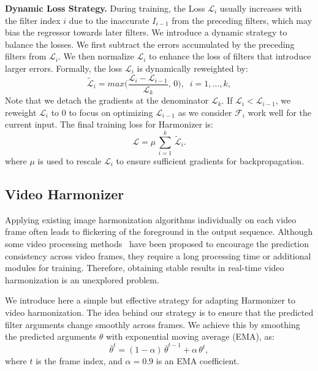 \documentclass[runningheads]{llncs}
\newcommand{\ke}[1]{{\color{black}#1}}
\begin{document}
\textbf{Dynamic Loss Strategy.} During training, the Loss $\mathcal{L}_i$ usually increases with the filter index $i$ due to the inaccurate $I_{i-1}$ from the preceding filters, which may bias the regressor towards later filters. We introduce a dynamic strategy to balance the losses. We first subtract the errors accumulated by the preceding filters from $\mathcal{L}_i$. We then normalize $\mathcal{L}_i$ to enhance the loss of filters that introduce larger errors. Formally, the loss $\mathcal{L}_i$ is dynamically reweighted by:
\begin{equation}\label{eq:dynamic_loss}
    \mathcal{\tilde{L}}_i = max\Big(\frac{\mathcal{L}_i - \mathcal{L}_{i-1}}{\mathcal{L}_k}, \, 0\Big), \;\; i=1, \dots, k,
\end{equation}
\ke{Note that we detach the gradients at the denominator $\mathcal{L}_k$. If $\mathcal{L}_{i}<\mathcal{L}_{i-1}$, we reweight $\mathcal{L}_i$ to $0$ to focus on optimizing $\mathcal{L}_{i-1}$ as we consider $\mathcal{F}_{i}$ work well for the current input.}
The final training loss for Harmonizer is:
\begin{equation}\label{eq:total_loss}
    \mathcal{L} = \mu\,\sum^{k}_{i=1}\,\mathcal{\tilde{L}}_{i}.
\end{equation}
\ke{where $\mu$ is used to rescale $\mathcal{L}_i$ to ensure sufficient gradients for backpropagation.}


\subsection{Video Harmonizer}\label{sec:video}

Applying existing image harmonization algorithms individually on each video frame often leads to flickering of the foreground in the output sequence. Although some video processing methods~\cite{bonneel2013examplebased,bonneel2015blind,Lai-ECCV-2018,lei2020dvp} have been proposed to encourage the prediction consistency across video frames, they require a long processing time or additional modules for training. 
Therefore, obtaining stable results in real-time video harmonization is an unexplored problem.

We introduce here a simple but effective strategy for adapting Harmonizer to video harmonization. The idea behind our strategy is to ensure that the predicted filter arguments change smoothly across frames. 
We achieve this by smoothing the predicted arguments $\theta$ with exponential moving average (EMA), as:
\begin{equation}\label{eq:video}
    \bar{\theta}^{t} = (1 - \alpha) \, \bar{\theta}^{t-1} +  \alpha \, \theta^{t},
\end{equation}
where $t$ is the frame index, and $\alpha=0.9$ is an EMA coefficient.
\end{document}
